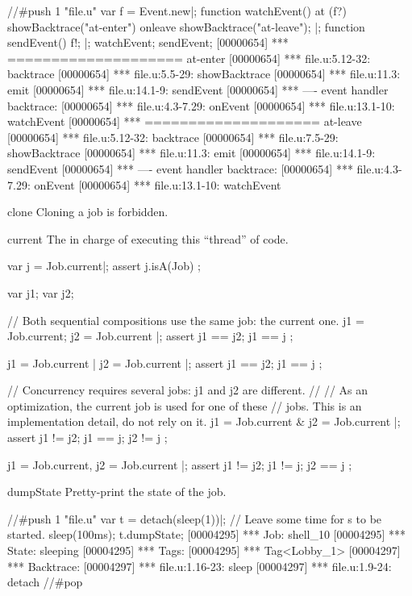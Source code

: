 \begin{urbiscriptapi}
\begin{urbiscript}
//#push 1 "file.u"
var f = Event.new|;
function watchEvent()
{
  at (f?)
    showBacktrace("at-enter")
  onleave
    showBacktrace("at-leave");
}|;
function sendEvent()
{
  f!;
}|;
watchEvent;
sendEvent;
[00000654] *** ==================== at-enter
[00000654] *** file.u:5.12-32: backtrace
[00000654] *** file.u:5.5-29: showBacktrace
[00000654] *** file.u:11.3: emit
[00000654] *** file.u:14.1-9: sendEvent
[00000654] *** ---- event handler backtrace:
[00000654] *** file.u:4.3-7.29: onEvent
[00000654] *** file.u:13.1-10: watchEvent
[00000654] *** ==================== at-leave
[00000654] *** file.u:5.12-32: backtrace
[00000654] *** file.u:7.5-29: showBacktrace
[00000654] *** file.u:11.3: emit
[00000654] *** file.u:14.1-9: sendEvent
[00000654] *** ---- event handler backtrace:
[00000654] *** file.u:4.3-7.29: onEvent
[00000654] *** file.u:13.1-10: watchEvent
\end{urbiscript}


\item[clone]
  Cloning a job is forbidden.


\item[current]%
  The  in charge of executing this ``thread'' of code.
\begin{urbiscript}
var j = Job.current|;
assert { j.isA(Job) };

var j1; var j2;

// Both sequential compositions use the same job: the current one.
{ j1 = Job.current; j2 = Job.current }|;
assert { j1 == j2; j1 == j };

{ j1 = Job.current | j2 = Job.current }|;
assert { j1 == j2; j1 == j };

// Concurrency requires several jobs: j1 and j2 are different.
//
// As an optimization, the current job is used for one of these
// jobs.  This is an implementation detail, do not rely on it.
{ j1 = Job.current & j2 = Job.current }|;
assert { j1 != j2; j1 == j; j2 != j };

{ j1 = Job.current, j2 = Job.current }|;
assert { j1 != j2; j1 != j; j2 == j };
\end{urbiscript}


\item[dumpState]
  Pretty-print the state of the job.

\begin{urbiscript}
//#push 1 "file.u"
var t = detach(sleep(1))|;
// Leave some time for s to be started.
sleep(100ms);
t.dumpState;
[00004295] *** Job: shell_10
[00004295] ***   State: sleeping
[00004295] ***   Tags:
[00004295] ***     Tag<Lobby_1>
[00004297] ***   Backtrace:
[00004297] ***     file.u:1.16-23: sleep
[00004297] ***     file.u:1.9-24: detach
//#pop
\end{urbiscript}



\end{urbiscriptapi}
